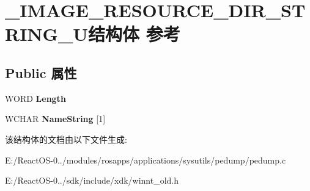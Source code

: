 \hypertarget{struct___i_m_a_g_e___r_e_s_o_u_r_c_e___d_i_r___s_t_r_i_n_g___u}{}\section{\+\_\+\+I\+M\+A\+G\+E\+\_\+\+R\+E\+S\+O\+U\+R\+C\+E\+\_\+\+D\+I\+R\+\_\+\+S\+T\+R\+I\+N\+G\+\_\+\+U结构体 参考}
\label{struct___i_m_a_g_e___r_e_s_o_u_r_c_e___d_i_r___s_t_r_i_n_g___u}
\subsection*{Public 属性}
\begin{DoxyCompactItemize}
\item 
\mbox{\label{struct___i_m_a_g_e___r_e_s_o_u_r_c_e___d_i_r___s_t_r_i_n_g___u_a8653143de8900b24983bd351f1c95bc4}} 
W\+O\+RD {\bfseries Length}
\item 
\mbox{\label{struct___i_m_a_g_e___r_e_s_o_u_r_c_e___d_i_r___s_t_r_i_n_g___u_a3962cc2dba820f6049db3218d4707608}} 
W\+C\+H\+AR {\bfseries Name\+String} \mbox{[}1\mbox{]}
\end{DoxyCompactItemize}


该结构体的文档由以下文件生成\+:\begin{DoxyCompactItemize}
\item 
E\+:/\+React\+O\+S-\/0../modules/rosapps/applications/sysutils/pedump/pedump.\+c\item 
E\+:/\+React\+O\+S-\/0../sdk/include/xdk/winnt\+\_\+old.\+h\end{DoxyCompactItemize}
